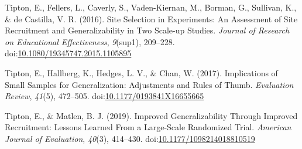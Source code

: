\documentclass[man,floatsintext]{apa6}
\begin{document}
\leavevmode\hypertarget{ref-tiptonSiteSelectionExperiments2016}{}%
Tipton, E., Fellers, L., Caverly, S., Vaden-Kiernan, M., Borman, G., Sullivan, K., \& de Castilla, V. R. (2016). Site Selection in Experiments: An Assessment of Site Recruitment and Generalizability in Two Scale-up Studies. \emph{Journal of Research on Educational Effectiveness}, \emph{9}(sup1), 209--228. doi:\href{https://doi.org/10.1080/19345747.2015.1105895}{10.1080/19345747.2015.1105895}

\leavevmode\hypertarget{ref-tiptonImplicationsSmallSamples2017}{}%
Tipton, E., Hallberg, K., Hedges, L. V., \& Chan, W. (2017). Implications of Small Samples for Generalization: Adjustments and Rules of Thumb. \emph{Evaluation Review}, \emph{41}(5), 472--505. doi:\href{https://doi.org/10.1177/0193841X16655665}{10.1177/0193841X16655665}

\leavevmode\hypertarget{ref-tiptonImprovedGeneralizabilityImproved2019}{}%
Tipton, E., \& Matlen, B. J. (2019). Improved Generalizability Through Improved Recruitment: Lessons Learned From a Large-Scale Randomized Trial. \emph{American Journal of Evaluation}, \emph{40}(3), 414--430. doi:\href{https://doi.org/10.1177/1098214018810519}{10.1177/1098214018810519}

\endgroup
\end{document}
